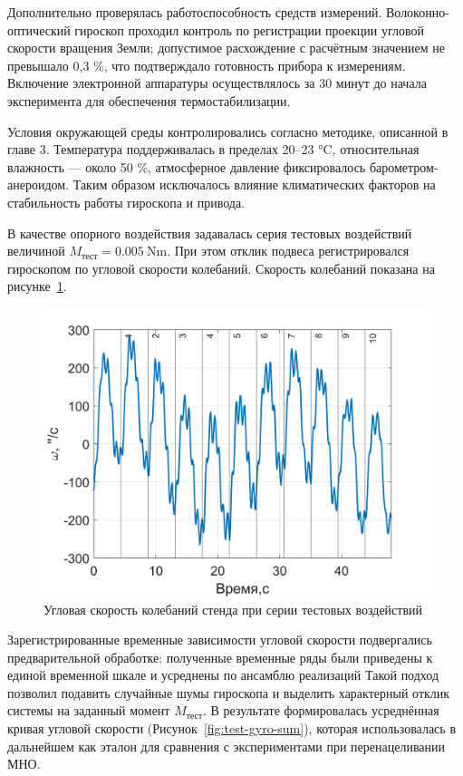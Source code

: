 Дополнительно проверялась работоспособность средств измерений. Волоконно-оптический гироскоп проходил контроль по регистрации проекции угловой скорости вращения Земли; допустимое расхождение с расчётным значением не превышало 0,3 \%, что подтверждало готовность прибора к измерениям. Включение электронной аппаратуры осуществлялось за 30 минут до начала эксперимента для обеспечения термостабилизации.

Условия окружающей среды контролировались согласно методике, описанной в главе 3. Температура поддерживалась в пределах 20–23 °C, относительная влажность — около 50 \%, атмосферное давление фиксировалось барометром-анероидом. Таким образом исключалось влияние климатических факторов на стабильность работы гироскопа и привода.

В качестве опорного воздействия задавалась серия тестовых воздействий величиной $M_{\text{тест}} = \SI{0,005}{\newton\meter}$. При этом отклик подвеса регистрировался гироскопом по угловой скорости колебаний. Скорость колебаний показана на рисунке~\cref{fig:test-gyro}.

\begin{figure}[h!]
	\centering
	\includegraphics[scale=0.8]{matlab/img/test-gyro}
	\caption{Угловая скорость колебаний стенда при серии тестовых воздействий}
	\label{fig:test-gyro}
\end{figure}

Зарегистрированные временные зависимости угловой скорости подвергались предварительной обработке: полученные временные ряды были приведены к единой временной шкале и усреднены по ансамблю реализаций Такой подход позволил подавить случайные шумы гироскопа и выделить характерный отклик системы на заданный момент $M_{\text{тест}}$. В результате формировалась усреднённая кривая угловой скорости (Рисунок~\cref{fig:test-gyro-sum}), которая использовалась в дальнейшем как эталон для сравнения с экспериментами при перенацеливании МНО.

